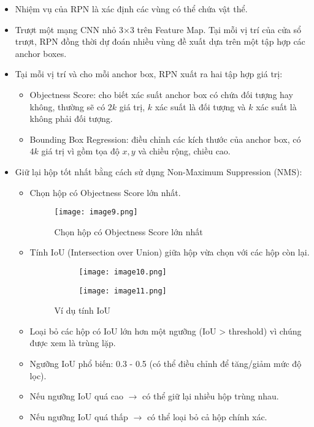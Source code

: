 \documentclass{article}
\begin{document}
\begin{itemize}
    \item Nhiệm vụ của RPN là xác định các vùng có thể chứa vật thể.
    \item Trượt một mạng CNN nhỏ 3×3 trên Feature Map. Tại mỗi vị trí của cửa sổ trượt, RPN đồng thời dự đoán nhiều vùng đề xuất dựa trên một tập hợp các anchor boxes.
    \item Tại mỗi vị trí và cho mỗi anchor box, RPN xuất ra hai tập hợp giá trị:
    \begin{itemize}
        \item Objectness Score: cho biết xác suất anchor box có chứa đối tượng hay không, thường sẽ có $2k$ giá trị, $k$ xác suất là đối tượng và $k$ xác suất là không phải đối tượng.
        \item Bounding Box Regression: điều chỉnh các kích thước của anchor box, có $4k$ giá trị vì gồm tọa độ $x, y$ và chiều rộng, chiều cao.
    \end{itemize}
    \item Giữ lại hộp tốt nhất bằng cách sử dụng Non-Maximum Suppression (NMS):
    \begin{itemize}
        \item Chọn hộp có Objectness Score lớn nhất.
        \begin{figure}[H]
            \centering
            \texttt{[image: image9.png]}
            \caption{Chọn hộp có Objectness Score lớn nhất}
        \end{figure}
        \item Tính IoU (Intersection over Union) giữa hộp vừa chọn với các hộp còn lại.
        \begin{figure}[H]
            \begin{subfigure}{0.45\textwidth}
                \centering
                \texttt{[image: image10.png]}
            \end{subfigure}
            \hfill
            \begin{subfigure}{0.45\textwidth}
                \centering
                \texttt{[image: image11.png]}
            \end{subfigure}
            \caption{Ví dụ tính IoU}
        \end{figure}
        \item Loại bỏ các hộp có IoU lớn hơn một ngưỡng (IoU > threshold) vì chúng được xem là trùng lặp.
        \item Ngưỡng IoU phổ biến: 0.3 - 0.5 (có thể điều chỉnh để tăng/giảm mức độ lọc).
        \item Nếu ngưỡng IoU quá cao $\rightarrow$ có thể giữ lại nhiều hộp trùng nhau.
        \item Nếu ngưỡng IoU quá thấp $\rightarrow$ có thể loại bỏ cả hộp chính xác.
    \end{itemize}
\end{itemize}
\end{document}
